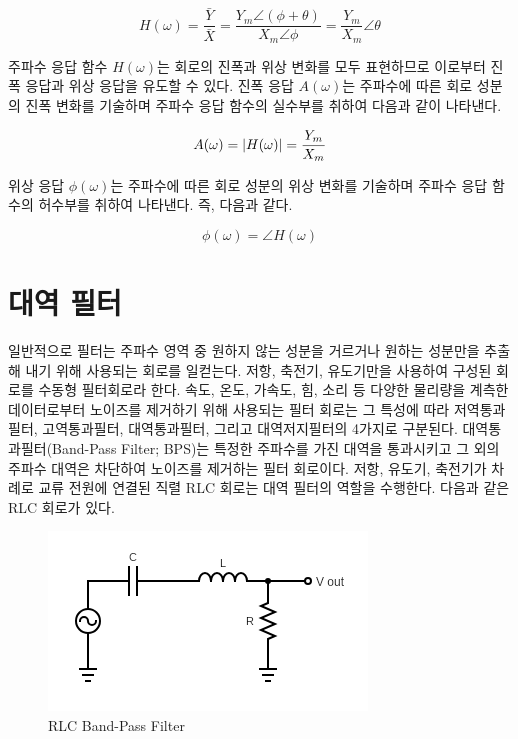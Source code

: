 \documentclass{article}
\begin{document}
\begin{equation}
    H(\omega)=\frac{\bar{Y}}{\bar{X}}=\frac{Y_m\angle(\phi+\theta)}{X_m\angle\phi}=\frac{Y_m}{X_m}\angle\theta
\end{equation}

주파수 응답 함수 $H(\omega)$는 회로의 진폭과 위상 변화를 모두 표현하므로 이로부터 진폭 응답과 위상 응답을 유도할 수 있다. 진폭 응답 $A(\omega)$는 주파수에 따른 회로 성분의 진폭 변화를 기술하며 주파수 응답 함수의 실수부를 취하여 다음과 같이 나타낸다.

\begin{equation}
    A(\omega)=\abs{H(\omega)}=\frac{Y_m}{X_m}
\end{equation}

위상 응답 $\phi(\omega)$는 주파수에 따른 회로 성분의 위상 변화를 기술하며 주파수 응답 함수의 허수부를 취하여 나타낸다. 즉, 다음과 같다.

\begin{equation}
    \phi(\omega)=\angle H(\omega)
\end{equation}


\section{대역 필터}
일반적으로 필터는 주파수 영역 중 원하지 않는 성분을 거르거나 원하는 성분만을 추출해 내기 위해 사용되는 회로를 일컫는다. 저항, 축전기, 유도기만을 사용하여 구성된 회로를 수동형 필터회로라 한다. 속도, 온도, 가속도, 힘, 소리 등 다양한 물리량을 계측한 데이터로부터 노이즈를 제거하기 위해 사용되는 필터 회로는 그 특성에 따라 저역통과필터, 고역통과필터, 대역통과필터, 그리고 대역저지필터의 4가지로 구분된다. 대역통과필터(Band-Pass Filter; BPS)는 특정한 주파수를 가진 대역을 통과시키고 그 외의 주파수 대역은 차단하여 노이즈를 제거하는 필터 회로이다. 저항, 유도기, 축전기가 차례로 교류 전원에 연결된 직렬 RLC 회로는 대역 필터의 역할을 수행한다. 다음과 같은 RLC 회로가 있다.

 \begin{figure}[h]
    \centering
    \includegraphics[scale=0.5]{./RLC Circuit.png}
    \caption{RLC Band-Pass Filter}
\end{figure}
\end{document}

